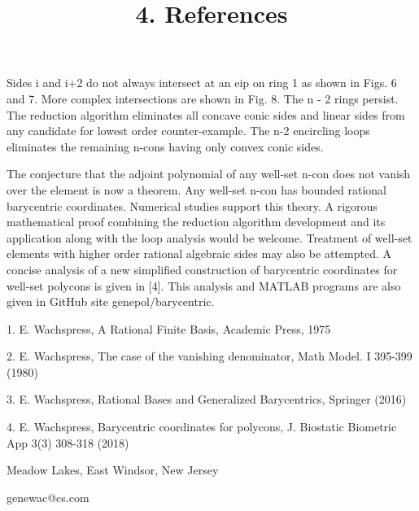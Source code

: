 \documentclass{article}
\begin{document}
Sides i and i+2 do not always intersect at an eip on ring 1 as shown in Figs. 6 and 7.  More complex intersections are shown in Fig. 8.  The n - 2 rings persist. The reduction algorithm eliminates all concave conic sides and linear sides from any candidate for lowest order counter-example.  The n-2 encircling loops eliminates the remaining n-cons having only convex conic sides. 
\par 
The conjecture that the adjoint polynomial of any well-set n-con does not vanish over the element is now a theorem.  Any well-set n-con has bounded rational barycentric coordinates.
Numerical studies support this theory.  A rigorous mathematical proof combining the reduction algorithm development and its application along with the loop analysis would be welcome.  Treatment of well-set elements with higher order rational algebraic sides may also be attempted.  A concise analysis of a new simplified construction of barycentric coordinates for well-set polycons is given in [4]. 
This analysis and MATLAB programs are also given in GitHub site genepol/barycentric.
\par
\title {4. References}
\par
1. E. Wachspress, A Rational Finite Basis, Academic Press, 1975

2. E. Wachspress, The case of the vanishing denominator, Math Model. I 395-399 (1980)

3. E. Wachspress, Rational Bases and Generalized Barycentrics, Springer (2016)

4. E. Wachspress, Barycentric coordinates for polycons, J. Biostatic Biometric App 3(3) 308-318 (2018)
\par
Meadow Lakes, East Windsor, New Jersey
\par
genewac@cs.com


\enddocument
\end{document}
